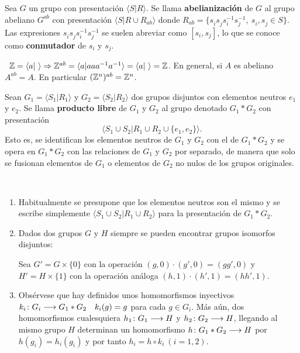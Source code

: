 \documentclass[GTS.tex]{subfiles}
\begin{document}
\begin{defi}
Sea $G$ un grupo con presentación $\langle S|R\rangle$. Se llama \textbf{abelianización} de $G$ al grupo abeliano $G^{ab}$ con presentación $\langle S| R\cup R_{ab}\rangle$ donde $R_{ab}=\{s^{}_i s^{}_j s^{-1}_i s^{-1}_j,\ s^{}_i, s^{}_j\in S \}$. Las expresiones $s^{}_i s^{}_j s^{-1}_i s^{-1}_j$ se suelen abreviar como $[s_i,s_j]$, lo que se conoce como \textbf{conmutador} de $s_i$ y $s_j$.
\end{defi}

\begin{ej}\
$\mathbb{Z}=\langle a|\ \rangle\Rightarrow \mathbb{Z}^{ab}=\langle a| aaa^{-1}a^{-1}\rangle=\langle a|\ \rangle =\mathbb{Z}$. En general, si $A$ es abeliano $A^{ab}=A$. En particular $(\mathbb{Z}^n)^{ab}=\mathbb{Z}^n$.
\end{ej}

\vspace{1cm}

\begin{defi}
Sean $G_1=\langle S_1|R_1\rangle$ y $G_2=\langle S_2|R_2\rangle$ dos grupos disjuntos con elementos neutros $e_1$ y $e_2$. Se llama \textbf{producto libre} de $G_1$ y $G_2$ al grupo denotado $G_1*G_2$ con presentación
\[
\langle S_1\cup S_2|R_1\cup R_2\cup\{e_1,e_2\}\rangle.
\]
Esto es, se identifican los elementos neutros de $G_1$ y $G_2$ con el de $G_1*G_2$ y se opera en $G_1*G_2$ con las relaciones de $G_1$ y $G_2$ por separado, de manera que solo se fusionan elementos de $G_1$ o elementos de $G_2$ no nulos de los grupos originales.
\end{defi}

\begin{nota}\
\begin{enumerate}
\item Habitualmente se presupone que los elementos neutros son el mismo y se escribe simplemente $\langle S_1\cup S_2|R_1\cup R_2\rangle$ para la presentación de $G_1*G_2$.
\item Dados dos grupos $G$ y $H$ siempre se pueden encontrar grupos isomorfos disjuntos:

Sea $G'=G\times\{0\}$ con la operación $(g,0)\cdot(g',0)=(gg',0)$ y $H'=H\times\{1\}$ con la operación análoga $(h,1)\cdot(h',1)=(hh',1)$.
\item Obsérvese que hay definidos unos homomorfismos inyectivos $k_i\colon{G_i}\longrightarrow{G_1*G_2}\quad k_i(g)=g$ para cada $g\in G_i$. Más aún, dos homomorfismos cualesquiera $h_1\colon{G_1}\longrightarrow{H}$ y $h_2\colon{G_2}\longrightarrow{H}$, llegando al mismo grupo $H$ determinan un homomorfismo $h\colon{G_1*G_2}\longrightarrow{H}$ por $h(g_i)=h_i(g_i)$ y por tanto $h_i=h\circ k_i\ (i=1,2)$.
\end{enumerate}
\end{nota}
\end{document}
